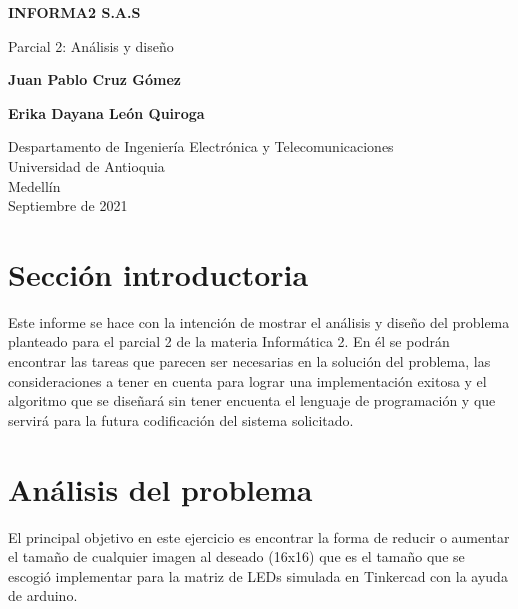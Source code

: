 \documentclass{article}
\begin{document}
\begin{titlepage}
    \begin{center}
        \vspace*{0cm}
            
        \Huge
        \textbf{INFORMA2 S.A.S}
            
        \vspace{0.5cm}
        \LARGE
        Parcial 2: Análisis y diseño 
            
        \vspace{5cm}
            
        \textbf{Juan Pablo Cruz Gómez}
        
        \vspace{0.5cm}
        
        \textbf{Erika Dayana León Quiroga}
            
        \vfill
            
        \vspace{0.8cm}
            
        \Large
        Despartamento de Ingeniería Electrónica y Telecomunicaciones\\
        Universidad de Antioquia\\
        Medellín\\
        Septiembre de 2021
            
    \end{center}
\end{titlepage}

\tableofcontents
\newpage
\section{Sección introductoria}\label{intro}
Este informe se hace con la intención de mostrar el análisis y diseño del problema planteado para el parcial 2 de la materia Informática 2. En él se podrán encontrar las tareas que parecen ser necesarias en la solución del problema, las consideraciones a tener en cuenta para lograr una implementación exitosa y el algoritmo que se diseñará sin tener encuenta el lenguaje de programación y que servirá para la futura codificación del sistema solicitado. 

\section{Análisis del problema} \label{contenido}
El principal objetivo en este ejercicio es encontrar la forma de reducir o aumentar el tamaño de cualquier imagen al deseado (16x16) que es el tamaño que se escogió implementar para la matriz de LEDs simulada en Tinkercad con la ayuda de arduino.
\end{document}
